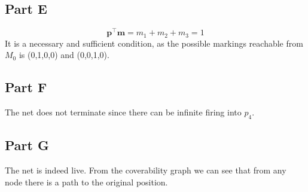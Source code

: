 \documentclass[11pt]{article}
\begin{document}
\subsection{Part E}
\begin{equation}
    \textbf{p}^\top \textbf{m} = m_1 + m_2 + m_3 = 1
\end{equation}
It is a necessary and sufficient condition, as the possible markings reachable from $M_0$ is (0,1,0,0) and (0,0,1,0).

\subsection{Part F}
The net does not terminate since there can be infinite firing into $p_4$.

\subsection{Part G}
The net is indeed live.
From the coverability graph we can see that from any node there is a path to the original position.
\end{document}
